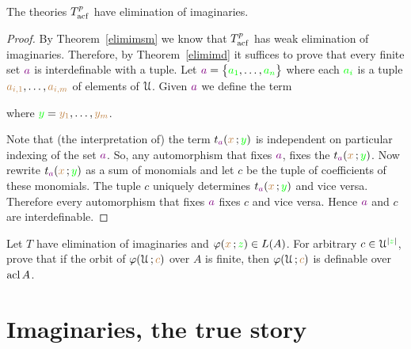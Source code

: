 \documentclass[creche.tex]{subfiles}
\begin{document}
\begin{theorem}\label{elimimacf} 
The theories $T^p_{\rm acf}$ have elimination of imaginaries.
\end{theorem}

\begin{proof}
By Theorem~\ref{elimimsm} we know that $T^p_{\rm acf}$ has weak elimination of imaginaries. Therefore, by Theorem~\ref{elimimd} it suffices to prove that every finite set ${\color{violet} a}$ is interdefinable with a tuple. Let ${\color{violet} a}=\big\{{\color{green} a_1},\dots,{\color{green} a_n}\big\}$ where each ${\color{green} a_i}$ is a tuple ${\color{brown} a_{i,1}},\dots,{\color{brown} a_{i,m}}$ of elements of $\EuScript U$. Given ${\color{violet} a}$ we define the term

\hfill where ${\color{green} y}={\color{brown} y_1},\dots,{\color{brown} y_m}$.


Note that (the interpretation of) the term $t_{\color{violet} a}({\color{brown} x}\,;{\color{green} y})$ is independent on particular indexing of the set ${\color{violet} a}$. So, any automorphism that fixes ${\color{violet} a}$, fixes the  $t_{\color{violet} a}({\color{brown} x}\,;{\color{green} y})$. Now rewrite $t_{\color{violet} a}({\color{brown} x}\,;{\color{green} y})$ as a sum of monomials and let $c$ be the tuple of coefficients of these monomials. The tuple $c$ uniquely determines $t_{\color{violet} a}({\color{brown} x}\,;{\color{green} y})$ and vice versa. Therefore every automorphism that fixes  ${\color{violet} a}$ fixes  $c$ and vice versa. Hence  ${\color{violet} a}$ and  $c$ are interdefinable.
\end{proof}

\begin{exercise}
Let $T$ have elimination of imaginaries and $\varphi({\color{brown} x}\,;{\color{green} z})\in L(A)$. For arbitrary $c\in\EuScript U^{|{\color{green} z}|}$, prove that if the orbit of $\varphi(\EuScript U\,; {\color{brown} c})$ over $A$ is finite, then $\varphi(\EuScript U\,; {\color{brown} c})$ is definable over $\mathop{\rm acl} A$.\QED
\end{exercise}


\section{Imaginaries, the true story}\label{imaginaries_long}
\end{document}

